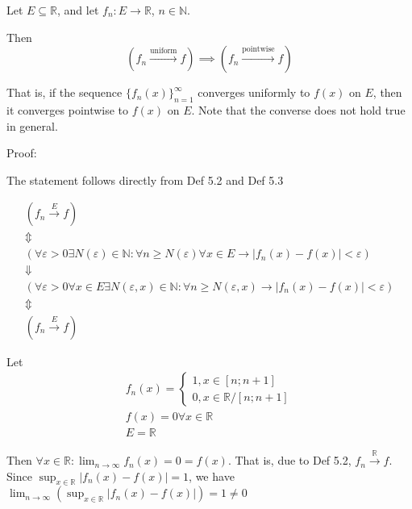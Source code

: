 Let $E \subseteq \mathbb{R}$, and let $f_n : E \to \mathbb{R}$, $n \in \mathbb{N}$.

Then
\[
    (f_n \xrightarrow{\text{uniform}} f) \implies (f_n \xrightarrow{\text{pointwise}} f)
\]

That is, if the sequence $\{f_n(x)\}_{n=1}^\infty$ converges uniformly to $f(x)$ on $E$, then it converges pointwise to $f(x)$ on $E$. Note that the converse does not hold true in general.

Proof:

The statement follows directly from Def 5.2 and Def 5.3

\begin{gather*}
    \left( f_n \xrightarrow{E} f \right) \\
    \Updownarrow \\
    \left( \forall \varepsilon > 0 \exists N\left( \varepsilon \right) \in \mathbb{N}: \forall n \geq N\left( \varepsilon \right) \forall x \in E \rightarrow \left| f_n \left( x\right) - f\left( x\right) \right| < \varepsilon \right) \\
    \Downarrow \\
    \left(\forall \varepsilon > 0 \forall x \in E \exists N(\varepsilon, x) \in \mathbb{N}: \forall n \geq N(\varepsilon, x) \rightarrow \left|f_n(x)-f(x)\right|<\varepsilon\right) \\
    \Updownarrow \\
    \left( f_n \xrightarrow{E} f \right)
\end{gather*}

Let
\begin{gather*}
    f_n\left( x \right) =
    \begin{cases}
        1, x \in \left[ n; n + 1 \right] \\
        0, x \in \mathbb{R} / \left[ n; n + 1 \right]
    \end{cases} \\
    f\left( x \right) = 0 \forall x \in \mathbb{R} \\
    E = \mathbb{R}
\end{gather*}

Then \(\forall x \in \mathbb{R}: \lim_{n \rightarrow \infty} f_n \left( x \right) = 0 = f\left( x \right) \). That is, due to Def 5.2, \(f_n \xrightarrow{\mathbb{R}} f\). Since \(\sup_{x \in \mathbb{R}}\left| f_n\left( x \right) - f\left( x \right) \right| = 1\), we have \( \lim_{n \rightarrow \infty} \left( \sup_{x \in \mathbb{R}} \left| f_n \left( x\right) - f\left( x\right) \right| \right) = 1 \ne 0\)


